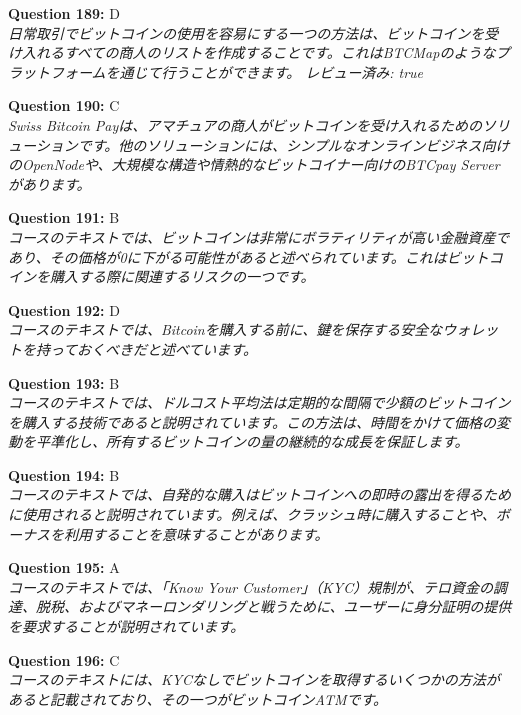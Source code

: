 \documentclass[12pt,a4paper]{article}
\begin{document}
\begin{enumerate}
{{{{{{{{{\item \textbf{Question 189:} D
\\ \textit{日常取引でビットコインの使用を容易にする一つの方法は、ビットコインを受け入れるすべての商人のリストを作成することです。これはBTCMapのようなプラットフォームを通じて行うことができます。 レビュー済み: true}

\item \textbf{Question 190:} C
\\ \textit{Swiss Bitcoin Payは、アマチュアの商人がビットコインを受け入れるためのソリューションです。他のソリューションには、シンプルなオンラインビジネス向けのOpenNodeや、大規模な構造や情熱的なビットコイナー向けのBTCpay Serverがあります。}

\item \textbf{Question 191:} B
\\ \textit{コースのテキストでは、ビットコインは非常にボラティリティが高い金融資産であり、その価格が0に下がる可能性があると述べられています。これはビットコインを購入する際に関連するリスクの一つです。}

\item \textbf{Question 192:} D
\\ \textit{コースのテキストでは、Bitcoinを購入する前に、鍵を保存する安全なウォレットを持っておくべきだと述べています。}

\item \textbf{Question 193:} B
\\ \textit{コースのテキストでは、ドルコスト平均法は定期的な間隔で少額のビットコインを購入する技術であると説明されています。この方法は、時間をかけて価格の変動を平準化し、所有するビットコインの量の継続的な成長を保証します。}

\item \textbf{Question 194:} B
\\ \textit{コースのテキストでは、自発的な購入はビットコインへの即時の露出を得るために使用されると説明されています。例えば、クラッシュ時に購入することや、ボーナスを利用することを意味することがあります。}

\item \textbf{Question 195:} A
\\ \textit{コースのテキストでは、「Know Your Customer」（KYC）規制が、テロ資金の調達、脱税、およびマネーロンダリングと戦うために、ユーザーに身分証明の提供を要求することが説明されています。}

\item \textbf{Question 196:} C
\\ \textit{コースのテキストには、KYCなしでビットコインを取得するいくつかの方法があると記載されており、その一つがビットコインATMです。}

}}}}}}}}}
\end{enumerate}
\end{document}
